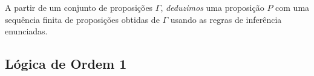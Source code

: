 \begin{comment}
\emph{Eliminações da Equivalência}:
\begin{prooftree}
\AxiomC{$P \lequiv P'$}
\RightLabel{$(\lequiv)$}
\UnaryInfC{$P \limplica P'$}
\end{prooftree}

\begin{prooftree}
\AxiomC{$P \lequiv P'$}
\RightLabel{$(\lequiv)$}
\UnaryInfC{$P' \limplica P$}
\end{prooftree}

\emph{Introdução da Condição}:
\begin{prooftree}
\AxiomC{ }
\AxiomC{$P$}
\LeftLabel{$\Big|$}
\UnaryInfC{$P'$}
\LeftLabel{$(\limplica)$}
\BinaryInfC{$P \limplica P'$}
\end{prooftree}

\emph{Eliminação da Condição}:
\begin{prooftree}
\AxiomC{$P$}
\AxiomC{$P \limplica P'$}
\RightLabel{$(\limplica)$}
\BinaryInfC{$P'$}
\end{prooftree}

\end{comment}

A partir de um conjunto de proposições $\Gamma$, \emph{deduzimos} uma proposição $P$ com uma sequência finita de proposições obtidas de $\Gamma$ usando as regras de inferência enunciadas.

\subsection{Lógica de Ordem 1}

